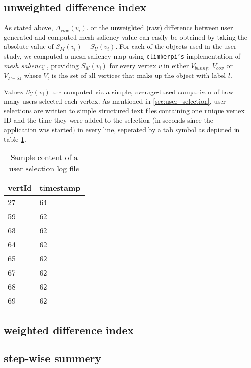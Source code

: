 		\subsection{unweighted difference index}
		\label{sec:unweighted_difference_index}
As stated above, $\Delta_{raw}(v_i)$, or the unweighted (raw) difference between user generated and computed mesh saliency value can easily be obtained by taking the absolute value of $S_{M}(v_i) - S_{U}(v_i)$. For each of the objects used in the user study, we computed a mesh saliency map using \texttt{climberpi's} implementation of \textit{mesh saliency} \cite{clms}, providing $S_{M}(v_i)$ for every vertex $v$ in either $V_{bunny}$, $V_{cow}$ or $V_{P-51}$ where $V_{l}$ is the set of all vertices that make up the object with label $l$.

Values $S_{U}(v_i)$ are computed via a simple, average-based comparison of how many users selected each vertex. As mentioned in \ref{sec:user_selection}, user selections are written to simple structured text files containing one unique vertex ID and the time they were added to the selection (in seconds since the application was started) in every line, seperated by a tab symbol as depicted in table \ref{tab:user_selection_log_file}.

\begin{table}[]
\centering
	\begin{tabular}{l|l}
	vertId & timestamp \\ \hline
	27 & 64 \\
	59 & 62 \\
	63 & 62 \\
	64 & 62 \\
	65 & 62 \\
	67 & 62 \\
	68 & 62 \\
	69 & 62
	\end{tabular}
	\caption{Sample content of a user selection log file}
	\label{tab:user_selection_log_file}
\end{table}


		\subsection{weighted difference index}
		\label{sec:weighted_difference_index}

		\subsection{step-wise summery}
		\label{sec:ste_wise_summery}
